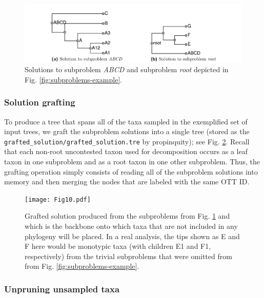 \documentclass[fleqn,12pt,lineno,english]{wlpeerj}
\begin{document}
\begin{figure}
\includegraphics[width=1.0\textwidth]{Fig9}  

\caption{Solutions to subproblem \emph{ABCD} and subproblem \emph{root} depicted in Fig. \ref{fig:subproblems-example}.}
\label{fig:subproblem-solutions.}
\end{figure}


\subsubsection{Solution grafting}

To produce a tree that spans all of the taxa sampled in the exemplified
set of input trees, we graft the subproblem solutions into a single
tree (stored as the \texttt{grafted\_solution/grafted\_solution.tre}
by propinquity); see Fig. \ref{fig:grafted-solution}. Recall that each non-root uncontested taxon used
for decomposition occurs as a leaf taxon in one subproblem and as
a root taxon in one other subproblem. Thus, the grafting operation
simply consists of reading all of the subproblem solutions into memory
and then merging the nodes that are labeled with the same OTT ID.

\begin{figure}
\begin{centering}
\texttt{[image: Fig10.pdf]}
\par\end{centering}
\caption{Grafted solution produced from the subproblems from
Fig. \ref{fig:subproblem-solutions.} and which is the 
backbone onto which taxa that are not included in any phylogeny
will be placed.
In a real analysis, the tips shown as E and F here
would be monotypic taxa (with children E1 and F1, respectively)
from the trivial subproblems that were omitted from from Fig. \ref{fig:subproblems-example}.}
\label{fig:grafted-solution}
\end{figure}


\subsubsection{Unpruning unsampled taxa}
\end{document}
